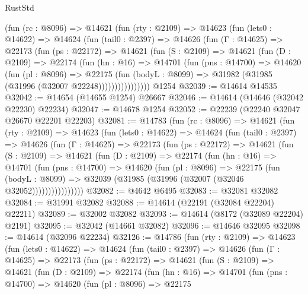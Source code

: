 \begin{lexlean}{RustStd}
\begin{coremodule}
      (fun (rc : @8096) =>
      @14621
        (fun (rty : @2109) =>
        @14623
          (fun (lets0 : @14622) =>
          @14624
            (fun (tail0 : @2397) =>
            @14626
              (fun (Γ : @14625) =>
              @22173
                (fun (ps : @22172) =>
                @14621
                  (fun (S : @2109) =>
                  @14621
                    (fun (D : @2109) =>
                    @22174
                      (fun (hn : @16) =>
                      @14701
                        (fun (pns : @14700) =>
                        @14620
                          (fun (pl : @8096) =>
                          @22175
                            (fun (bodyL : @8099) =>
                            @31982 (@31985 (@31996 (@32007 @22248))))))))))))))))
    @1254
@32039 := @14614 @14535
@32042 := @14654 (@14655 @1254) @26667
@32046 := @14614 (@14646 (@32042 @22230) @22234)
@32047 := @14678 @1254
@32052 := @22239 (@22240 @32047 @26670 @22201 @22203)
@32081 := @14783
    (fun (rc : @8096) =>
    @14621
      (fun (rty : @2109) =>
      @14623
        (fun (lets0 : @14622) =>
        @14624
          (fun (tail0 : @2397) =>
          @14626
            (fun (Γ : @14625) =>
            @22173
              (fun (ps : @22172) =>
              @14621
                (fun (S : @2109) =>
                @14621
                  (fun (D : @2109) =>
                  @22174
                    (fun (hn : @16) =>
                    @14701
                      (fun (pns : @14700) =>
                      @14620
                        (fun (pl : @8096) =>
                        @22175
                          (fun (bodyL : @8099) =>
                          @32039 (@31985 (@31996 (@32007 (@32046 @32052))))))))))))))))
@32082 := @4642 @6495
@32083 := @32081 @32082
@32084 := @31991 @32082
@32088 := @14614 (@22191 (@32084 @22204) @22211)
@32089 := @32002 @32082
@32093 := @14614 (@8172 (@32089 @22204) @2191)
@32095 := @32042 (@14661 @32082)
@32096 := @14646 @32095
@32098 := @14614 (@32096 @22234)
@32126 := @14786
    (fun (rty : @2109) =>
    @14623
      (fun (lets0 : @14622) =>
      @14624
        (fun (tail0 : @2397) =>
        @14626
          (fun (Γ : @14625) =>
          @22173
            (fun (ps : @22172) =>
            @14621
              (fun (S : @2109) =>
              @14621
                (fun (D : @2109) =>
                @22174
                  (fun (hn : @16) =>
                  @14701
                    (fun (pns : @14700) =>
                    @14620
                      (fun (pl : @8096) =>
                      @22175

\end{coremodule}
\end{lexlean}
